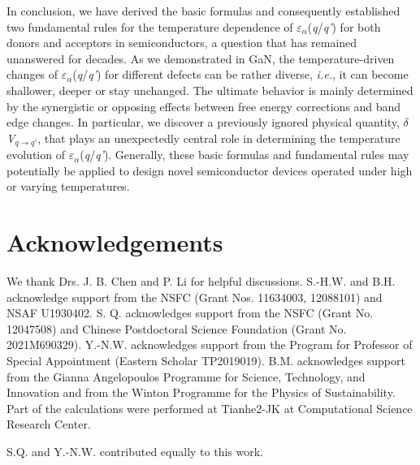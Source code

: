 \documentclass[onecolumn,preprint,superscriptaddress]{revtex4-1}
\begin{document}
In conclusion, we have derived the basic formulas and consequently established two fundamental rules for the temperature dependence of $\varepsilon$$_{\alpha}$(\emph{q}/\emph{q'}) for both donors and acceptors in semiconductors, a question that has remained unanswered for decades. As we demonstrated in GaN, the temperature-driven changes of $\varepsilon$$_{\alpha}$(\emph{q}/\emph{q'}) for different defects can be rather diverse, \emph{i.e.}, it can become shallower, deeper or stay unchanged. The ultimate behavior is mainly determined by the synergistic or opposing effects between free energy corrections and band edge changes. In particular, we discover a previously ignored physical quantity, $\delta$\emph{V}$_{q\rightarrow q'}$, that plays an unexpectedly central role in determining the temperature evolution of $\varepsilon$$_{\alpha}$(\emph{q}/\emph{q'}). Generally, these basic formulas and fundamental rules may potentially be applied to design novel semiconductor devices operated under high or varying temperatures.

\section*{Acknowledgements}
We thank Drs. J. B. Chen and P. Li for helpful discussions. S.-H.W. and B.H. acknowledge support from the NSFC (Grant Nos. 11634003, 12088101) and NSAF U1930402. S. Q. acknowledges support from the NSFC (Grant No. 12047508) and Chinese Postdoctoral Science Foundation (Grant No. 2021M690329). Y.-N.W. acknowledges support from the Program for Professor of Special Appointment (Eastern Scholar TP2019019). B.M. acknowledges support from the Gianna Angelopoulos Programme for Science, Technology, and Innovation and from the Winton Programme for the Physics of Sustainability. Part of the calculations were performed at Tianhe2-JK at Computational Science Research Center.

S.Q. and Y.-N.W. contributed equally to this work.
\end{document}
